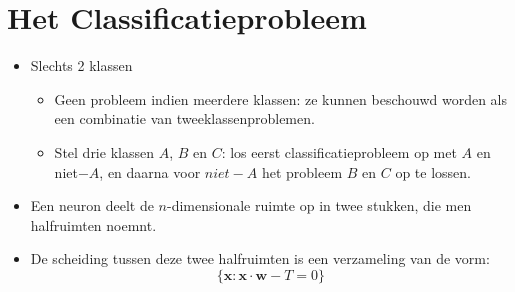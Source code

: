 \chapter{Het Classificatieprobleem}

\begin{itemize}
    \item Slechts 2 klassen
    \begin{itemize}
        \item Geen probleem indien meerdere klassen: ze kunnen beschouwd worden als een combinatie van tweeklassenproblemen.
        \item Stel drie klassen $A$, $B$ en $C$: los eerst classificatieprobleem op met $A$ en niet$-A$, en daarna voor $niet-A$ het probleem $B$ en $C$ op te lossen.
    \end{itemize}
    \item Een neuron deelt de $n$-dimensionale ruimte op in twee stukken, die men halfruimten noemnt.
    \item De scheiding tussen deze twee halfruimten is een verzameling van de vorm:
    $$\{\textbf{x} : \textbf{x} \cdot \textbf{w} - T = 0\}$$
\end{itemize}

